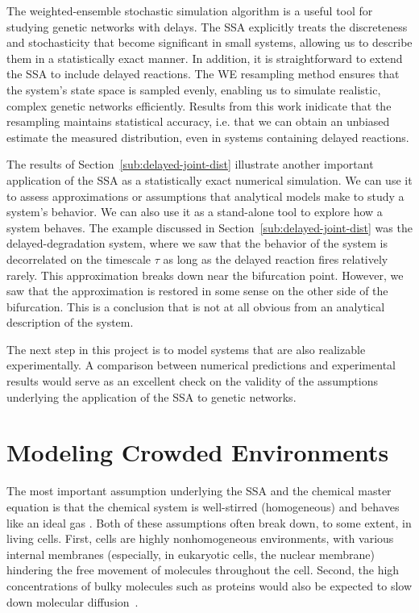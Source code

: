 \documentclass[english,letterpaper,12pt]{report}
\begin{document}
\begin{doublespacing}
The weighted-ensemble stochastic simulation algorithm is a useful tool for studying genetic networks with delays. The SSA explicitly treats the discreteness and stochasticity that become significant in small systems, allowing us to describe them in a statistically exact manner. In addition, it is straightforward to extend the SSA to include delayed reactions. The WE resampling method ensures that the system's state space is sampled evenly, enabling us to simulate realistic, complex genetic networks efficiently. Results from this work inidicate that the resampling maintains statistical accuracy, i.e. that we can obtain an unbiased estimate the measured distribution, even in systems containing delayed reactions.

The results of Section~\ref{sub:delayed-joint-dist} illustrate another important application of the SSA as a statistically exact numerical simulation. We can use it to assess approximations or assumptions that analytical models make to study a system's behavior. We can also use it as a stand-alone tool to explore how a system behaves. The example discussed in Section~\ref{sub:delayed-joint-dist} was the delayed-degradation system, where we saw that the behavior of the system is decorrelated on the timescale $\tau$ as long as the delayed reaction fires relatively rarely. This approximation breaks down near the bifurcation point. However, we saw that the approximation is restored in some sense on the other side of the bifurcation. This is a conclusion that is not at all obvious from an analytical description of the system.

The next step in this project is to model systems that are also realizable experimentally. A comparison between numerical predictions and experimental results would serve as an excellent check on the validity of the assumptions underlying the application of the SSA to genetic networks.

\section{Modeling Crowded Environments} %
\label{sub:diffusion-crowded}

The most important assumption underlying the SSA and the chemical master equation is that the chemical system is well-stirred (homogeneous) and behaves like an ideal gas \cite{langevin-limit}. Both of these assumptions often break down, to some extent, in living cells. First, cells are highly nonhomogeneous environments, with various internal membranes (especially, in eukaryotic cells, the nuclear membrane) hindering the free movement of molecules throughout the cell. Second, the high concentrations of bulky molecules such as proteins would also be expected to slow down molecular diffusion~\cite{art-cells-crowding}.


\end{doublespacing}
\end{document}
